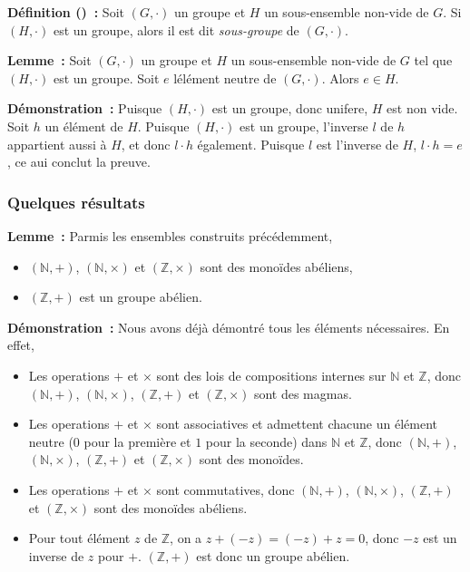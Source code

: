 \medskip

\noindent\textbf{Définition () :} Soit $(G, \cdot)$ un groupe et $H$ un sous-ensemble non-vide de $G$.
    Si $(H, \cdot)$ est un groupe, alors il est dit \textit{sous-groupe} de $(G, \cdot)$.

\medskip

\noindent\textbf{Lemme :} Soit $(G, \cdot)$ un groupe et $H$ un sous-ensemble non-vide de $G$ tel que $(H, \cdot)$ est un groupe.
    Soit $e$ lélément neutre de $(G, \cdot)$. 
    Alors $e \in H$.

\medskip

\noindent\textbf{Démonstration :} Puisque $(H, \cdot)$ est un groupe, donc unifere, $H$ est non vide. 
    Soit $h$ un élément de $H$. 
    Puisque $(H, \cdot)$ est un groupe, l'inverse $l$ de $h$ appartient aussi à $H$, et donc $l \cdot h$ également. 
    Puisque $l$ est l'inverse de $H$, $l \cdot h = e$, ce aui conclut la preuve.

    \done

\subsubsection{Quelques résultats}

\noindent\textbf{Lemme :} Parmis les ensembles construits précédemment, 
    \begin{itemize}[nosep]
        \item $(\mathbb{N},+)$, $(\mathbb{N},\times)$ et $(\mathbb{Z},\times)$ sont des monoïdes abéliens,
        \item $(\mathbb{Z},+)$ est un groupe abélien.
    \end{itemize}

\medskip

\noindent\textbf{Démonstration :} Nous avons déjà démontré tous les éléments nécessaires. 
    En effet, 
    \begin{itemize}[nosep]
        \item Les operations $+$ et $\times$ sont des lois de compositions internes sur $\mathbb{N}$ et $\mathbb{Z}$, donc $(\mathbb{N},+)$, $(\mathbb{N},\times)$, $(\mathbb{Z},+)$ et $(\mathbb{Z},\times)$ sont des magmas.
        \item Les operations $+$ et $\times$ sont associatives et admettent chacune un élément neutre ($0$ pour la première et $1$ pour la seconde) dans $\mathbb{N}$ et $\mathbb{Z}$, donc $(\mathbb{N},+)$, $(\mathbb{N},\times)$, $(\mathbb{Z},+)$ et $(\mathbb{Z},\times)$ sont des monoïdes.
        \item Les operations $+$ et $\times$ sont commutatives, donc $(\mathbb{N},+)$, $(\mathbb{N},\times)$, $(\mathbb{Z},+)$ et $(\mathbb{Z},\times)$ sont des monoïdes abéliens.
        \item Pour tout élément $z$ de $\mathbb{Z}$, on a $z + (-z) = (-z) + z = 0$, donc $-z$ est un inverse de $z$ pour $+$. 
            $(\mathbb{Z},+)$ est donc un groupe abélien.
    \end{itemize}

